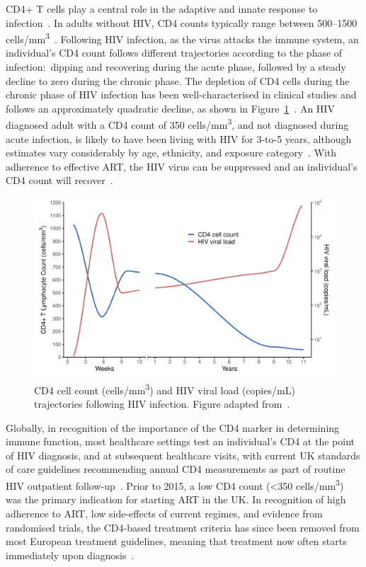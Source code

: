 CD4+ T cells play a central role in the adaptive and innate response to infection~\parencite{MacLeod2009-rm}. In adults without HIV, CD4 counts typically range between 500--1500 cells/mm\textsuperscript{3}~\parencite{Maini1996-dd}. Following HIV infection, as the virus attacks the immune system, an individual's CD4 count follows different trajectories according to the phase of infection:\ dipping and recovering during the acute phase, followed by a steady decline to zero during the chronic phase. The depletion of CD4 cells during the chronic phase of HIV infection has been well-characterised in clinical studies and follows an approximately quadratic decline, as shown in Figure~\ref{fig:cd4dip}~\parencite{Maartens2014-xd}. An HIV diagnosed adult with a CD4 count of 350 cells/mm\textsuperscript{3}, and not diagnosed during acute infection, is likely to have been living with HIV for 3-to-5 years, although estimates vary considerably by age, ethnicity, and exposure category~\parencite{Touloumi2013-nk, May2009-bc, Lodi2011-sf, Yin2021-me}. With adherence to effective ART, the HIV virus can be suppressed and an individual's CD4 count will recover~\parencite{Ford2015-ul}.

\begin{figure}[htbp!]
  \centering
  \includegraphics[width=\textwidth]{cd4_trajectory.pdf}
  \caption[CD4 cell count trajectory following HIV infection]{CD4 cell count (cells/mm\textsuperscript{3}) and HIV viral load (copies/mL) trajectories following HIV infection. Figure adapted from~\cite{Maartens2014-xd}.}\label{fig:cd4dip}
\end{figure}

Globally, in recognition of the importance of the CD4 marker in determining immune function, most healthcare settings test an individual's CD4 at the point of HIV diagnosis, and at subsequent healthcare visits, with current UK standards of care guidelines recommending annual CD4 measurements as part of routine HIV outpatient follow-up~\parencite{British_HIV_Association2018-ps}. Prior to 2015, a low CD4 count (<350 cells/mm\textsuperscript{3}) was the primary indication for starting ART in the UK\@. In recognition of high adherence to ART, low side-effects of current regimes, and evidence from randomised trials, the CD4-based treatment criteria has since been removed from most European treatment guidelines, meaning that treatment now often starts immediately upon diagnosis~\parencite{Churchill2016-ol, European_AIDS_Clinical_Society2023-rg, INSIGHT_START_Study_Group2015-af}.

